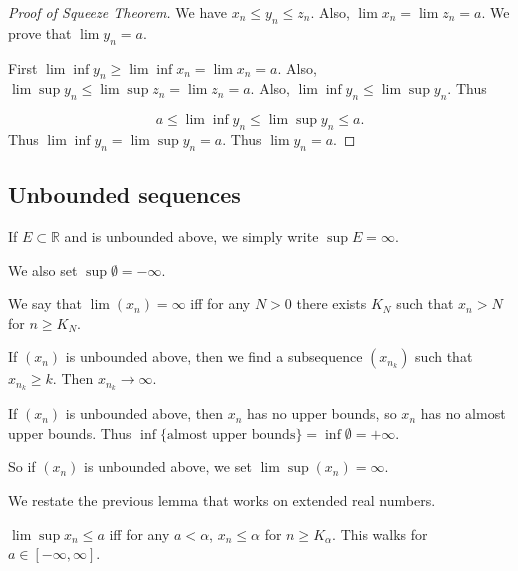 \begin{proof}[Proof of Squeeze Theorem]
	We have $x_n \le y_n \le z_n$. Also, $\lim x_n = \lim z_n = a$. We prove that $\lim y_n = a$. 

	First  $\lim\inf y_n \ge \lim\inf x_n = \lim x_n = a$. Also, $\lim \sup y_n \le  \lim \sup z_n = \lim z_n = a$. Also, $\lim \inf y_n \le  \lim \sup y_n$. Thus

	\[
		a \le \lim \inf y_n \le  \lim \sup y_n \le a
	.\] 
	Thus $\lim \inf y_n =  \lim \sup y_n = a$. Thus $\lim y_n = a$.
\end{proof}

\subsection{Unbounded sequences}

If $E \subset \mathbb{R}$ and is unbounded above, we simply write $\operatorname{sup} E = \infty $.
 

We also set $\operatorname{sup}  \emptyset  = - \infty $.

We say that $\lim (x_n) = \infty $ iff for any $N>0$ there exists $K_N$ such that $x_n > N$ for $n \ge  K_N$.

If $(x_n)$ is unbounded above, then we find a subsequence $\left( x_{n_k} \right) $ such that $x_{n_k}\ge k$. Then $x_{n_k} \to  \infty $. 

If $(x_n)$ is unbounded above, then $x_n$ has no upper bounds, so $x_n$ has no almost upper bounds. Thus $\operatorname{inf} \{\text{almost upper bounds}\} = \operatorname{inf} \emptyset  = +\infty $.

So if $(x_n)$ is unbounded above, we set $\lim\sup (x_n) = \infty $.

We restate the previous lemma that works on extended real numbers.
\begin{lemma}
	$\lim\sup x_n \le a$ iff for any $a < \alpha$, $x_n \le \alpha$ for $n \ge  K_\alpha$. This walks for $a \in [-\infty , \infty ]$.
\end{lemma}
